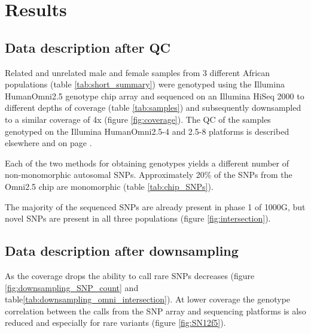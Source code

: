 \section{Results}

\subsection{Data description after QC}
\label{sec:agv_data_description}
Related and unrelated male and female samples from 3 different African populations (table \ref{tab:short_summary}) were genotyped using the Illumina HumanOmni2.5 genotype chip array and sequenced on an Illumina HiSeq 2000 to different depths of coverage (table \ref{tab:samples}) and subsequently downsampled to a similar coverage of 4x (figure \ref{fig:coverage}). The \gls{QC} of the samples genotyped on the Illumina HumanOmni2.5-4 and 2.5-8 platforms is described elsewhere\cite{Gurdasani2015} and on page \pageref{subsec:chipQC}.


Each of the two methods for obtaining genotypes yields a different number of non-monomorphic autosomal SNPs. Approximately 20\% of the SNPs from the Omni2.5 chip are monomorphic (table \ref{tab:chip_SNPs}).

The majority of the sequenced \glspl{SNP} are already present in phase 1 of \gls{1000G}\cite{1000G2012}, but novel SNPs are present in all three populations (figure \ref{fig:intersection}).


\subsection{Data description after downsampling}

As the coverage drops the ability to call rare \glspl{SNP} decreases (figure \ref{fig:downsampling_SNP_count} and table\ref{tab:downsampling_omni_intersection}). At lower coverage the genotype correlation between the calls from the SNP array and sequencing platforms is also reduced and especially for rare variants (figure \ref{fig:SN12f5}).


